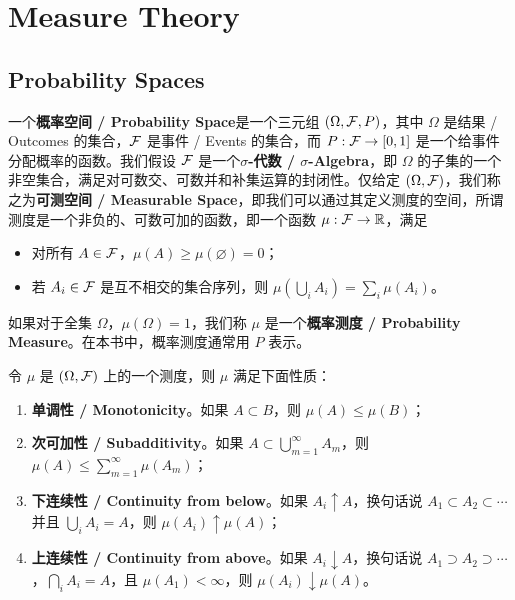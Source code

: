 \section{Measure Theory}

\subsection{Probability Spaces}

一个{\normalfont\bfseries 概率空间 / Probability Space}是一个三元组 $(\Omega, \mathcal{F}, P)$，其中 $\Omega$ 是结果 / Outcomes 的集合，$\mathcal{F}$ 是事件 / Events 的集合，而 $P : \mathcal{F} \to [0,1]$ 是一个给事件分配概率的函数。我们假设 $\mathcal{F}$ 是一个{\normalfont\bfseries $\sigma$-代数 / $\sigma$-Algebra}，即 $\Omega$ 的子集的一个非空集合，满足对可数交、可数并和补集运算的封闭性。仅给定 $(\Omega, \mathcal{F})$，我们称之为{\normalfont\bfseries 可测空间 / Measurable Space}，即我们可以通过其定义测度的空间，所谓测度是一个非负的、可数可加的函数，即一个函数 $\mu : \mathcal{F} \to \mathbb{R}$，满足

\begin{itemize}
    \item 对所有 $A \in \mathcal{F}$，$\mu(A) \ge \mu(\varnothing) = 0$；
    \item 若 $A_i \in \mathcal{F}$ 是互不相交的集合序列，则 $\mu\!\left( \bigcup_i A_i \right) = \sum_i \mu(A_i)$。
\end{itemize}

如果对于全集 $\Omega$，$\mu(\Omega) = 1$，我们称 $\mu$ 是一个{\normalfont\bfseries 概率测度 / Probability Measure}。在本书中，概率测度通常用 $P$ 表示。

\begin{theorem}
    令 $\mu$ 是 $(\Omega, \mathcal{F})$ 上的一个测度，则 $\mu$ 满足下面性质：
    \begin{enumerate}
        \item {\normalfont\bfseries 单调性 / Monotonicity}。如果 $A \subset B$，则 $\mu(A) \le \mu(B)$；
        \item {\normalfont\bfseries 次可加性 / Subadditivity}。如果 $A \subset \bigcup_{m=1}^{\infty} A_m$，则 $\mu(A) \le \sum_{m=1}^{\infty} \mu(A_m)$；
        \item {\normalfont\bfseries 下连续性 / Continuity from below}。如果 $A_i \uparrow A$，换句话说 $A_1 \subset A_2 \subset \cdots$ 并且 $\bigcup_i A_i = A$，则 $\mu(A_i) \uparrow \mu(A)$；
        \item {\normalfont\bfseries 上连续性 / Continuity from above}。如果 $A_i \downarrow A$，换句话说 $A_1 \supset A_2 \supset \cdots$，$\bigcap_i A_i = A$，且 $\mu(A_1) < \infty$，则 $\mu(A_i) \downarrow \mu(A)$。
    \end{enumerate}
\end{theorem}

